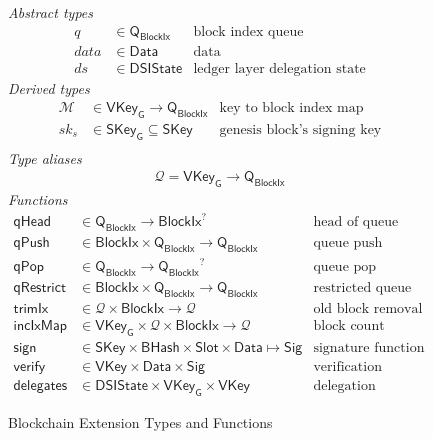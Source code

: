 \documentclass[11pt,a4paper]{article}
\newcommand{\fun}[1]{\mathsf{#1}}
\newcommand{\type}[1]{\mathsf{#1}}
\newcommand{\BHash}{\type{BHash}}  %
\newcommand{\Slot}{\type{Slot}}
\newcommand{\BlockIx}{\type{BlockIx}}
\newcommand{\Queue}{\type{Q}}
\newcommand{\SKey}{\type{SKey}}
\newcommand{\SKeyGen}{\type{SKey_G}}
\newcommand{\VKey}{\type{VKey}}
\newcommand{\VKeyGen}{\type{VKey_G}}
\newcommand{\Sig}{\type{Sig}}
\newcommand{\Data}{\type{Data}}
\newcommand{\DelegState}{\type{DSIState}}
\newcommand{\signname}{sign}
\newcommand{\verifyname}{verify}
\newcommand{\delegationname}{delegates} %
\newcommand{\signmapname}{\mathcal{M}}
\newcommand{\trimixname}{trimIx}
\newcommand{\incixmapname}{incIxMap}
\newcommand{\qrestrname}{qRestrict}
\newcommand{\qpopname}{qPop}
\newcommand{\qheadname}{qHead}
\newcommand{\qpushname}{qPush}
\newcommand{\totalf}{\to}
\newcommand{\partialf}{\mapsto}
\newcommand{\mapqueue}{\mathcal{Q}}
\begin{document}
\begin{figure}
  \emph{Abstract types}
  \begin{align*}
    q  & \in \Queue_\BlockIx  & \text{block index queue}\\
  data & \in \Data    & \text{data}\\
    ds & \in \DelegState & \text{ledger layer delegation state}
  \end{align*}
  \emph{Derived types}
  \begin{align*}
    \signmapname & \in \VKeyGen \totalf \Queue_\BlockIx & \text{key to block index map}\\
    sk_s & \in \SKeyGen \subseteq \SKey & \text{genesis block's signing key}\\
  \end{align*}
  \emph{Type aliases}
  \begin{align*}
    \mapqueue = \VKeyGen \totalf \Queue_\BlockIx
  \end{align*}
  \emph{Functions}
  \begin{align*}
    \fun{\qheadname} & \in \Queue_\BlockIx \totalf \BlockIx^? & \text{head of queue function} \\
    \fun{\qpushname} & \in \BlockIx \times \Queue_\BlockIx \totalf \Queue_\BlockIx
      & \text{queue push function} \\
    \fun{\qpopname} & \in \Queue_\BlockIx \totalf {\Queue_\BlockIx}^?
      & \text{queue pop function} \\
    \fun{\qrestrname} & \in \BlockIx \times \Queue_\BlockIx \totalf \Queue_\BlockIx
      & \text{restricted queue pop function} \\
    \fun{\trimixname} & \in \mapqueue \times \BlockIx \totalf \mapqueue
      & \text{old block removal function} \\
    \fun{\incixmapname} & \in \VKeyGen \times \mapqueue \times \BlockIx \totalf \mapqueue
      & \text{block count increment function}\\
    \fun{\signname} & \in \SKey \times \BHash \times \Slot \times \Data \partialf \Sig
      & \text{signature function}\\
    \fun{\verifyname} & \in \VKey \times \Data \times \Sig
      & \text{verification relation}\\
    \fun{\delegationname} & \in \DelegState \times \VKeyGen \times \VKey
      & \text{delegation relation}
  \end{align*}
  \caption{Blockchain Extension Types and Functions}
  \label{fig:block-ext-types-funs}
\end{figure}
\end{document}
